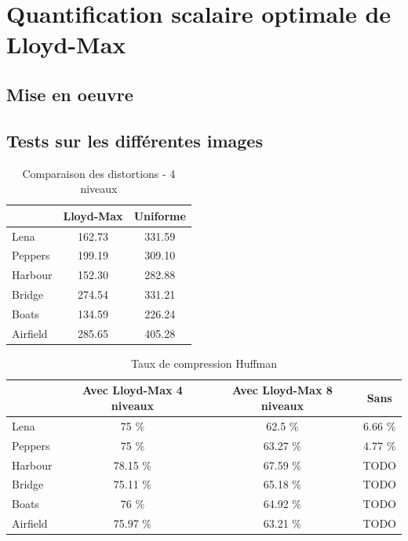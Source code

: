 \documentclass[a4paper, 12pt]{article}
\begin{document}
\section{Quantification scalaire optimale de Lloyd-Max}

\subsection{Mise en oeuvre}



\subsection{Tests sur les différentes images}

\begin{table}[!h]
	\centering
		\begin{tabular}{l|c | c|}
			\cline{2-3}
			                               & Lloyd-Max & Uniforme \\
			\hline
			\multicolumn{1}{|l|}{Lena}     & 162.73    &  331.59  \\
			\hline
			\multicolumn{1}{|l|}{Peppers}  & 199.19    &  309.10  \\
			\hline
			\multicolumn{1}{|l|}{Harbour}  & 152.30    &  282.88  \\
			\hline
			\multicolumn{1}{|l|}{Bridge}   & 274.54    &  331.21  \\
			\hline
			\multicolumn{1}{|l|}{Boats}    & 134.59    &  226.24  \\
			\hline
			\multicolumn{1}{|l|}{Airfield} & 285.65    &  405.28  \\
			\hline
		\end{tabular}
	\caption{Comparaison des distortions - 4 niveaux}
	\label{tab:TableComparaisonDisto}
\end{table}

\begin{table}[!h]
	\centering
		\begin{tabular}{l|c | c| c|}
			\cline{2-4}
			                               & Avec Lloyd-Max 4 niveaux & Avec Lloyd-Max 8 niveaux & Sans    \\
			\hline
			\multicolumn{1}{|l|}{Lena}     & 75 \%                    & 62.5 \%                  & 6.66 \%  \\
			\hline
			\multicolumn{1}{|l|}{Peppers}  & 75 \%                    & 63.27 \%                 & 4.77 \%  \\
			\hline
			\multicolumn{1}{|l|}{Harbour}  & 78.15 \%                 & 67.59 \%                 & TODO  \\
			\hline
			\multicolumn{1}{|l|}{Bridge}   & 75.11 \%                 & 65.18 \%                 & TODO  \\
			\hline
			\multicolumn{1}{|l|}{Boats}    & 76 \%                    & 64.92 \%                 & TODO  \\
			\hline
			\multicolumn{1}{|l|}{Airfield} & 75.97 \%                 & 63.21 \%                 & TODO  \\
			\hline
		\end{tabular}
	\caption{Taux de compression Huffman}
	\label{tab:TableComparaisonDisto}
\end{table}
\end{document}
